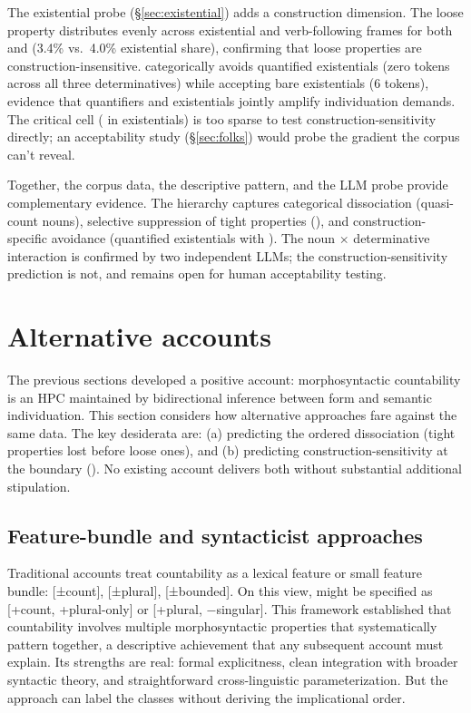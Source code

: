 \documentclass[12pt,a4paper]{article}
\begin{document}
The existential probe (\S\ref{sec:existential}) adds a construction dimension. The loose property  distributes evenly across existential and verb-following frames for both  and  (3.4\% vs.\ 4.0\% existential share), confirming that loose properties are construction-insensitive.  categorically avoids quantified existentials (zero tokens across all three determinatives) while accepting bare existentials (6 tokens), evidence that quantifiers and existentials jointly amplify individuation demands. The critical cell ( in existentials) is too sparse to test construction-sensitivity directly; an acceptability study (\S\ref{sec:folks}) would probe the gradient the corpus can't reveal.

Together, the corpus data, the descriptive pattern, and the LLM probe provide complementary evidence. The hierarchy captures categorical dissociation (quasi-count nouns), selective suppression of tight properties (), and construction-specific avoidance (quantified existentials with ). The noun $\times$ determinative interaction is confirmed by two independent LLMs; the construction-sensitivity prediction is not, and remains open for human acceptability testing.

\section{Alternative accounts}\label{sec:alternatives}

The previous sections developed a positive account: morphosyntactic countability is an HPC maintained by bidirectional inference between form and semantic individuation. This section considers how alternative approaches fare against the same data. The key desiderata are: (a) predicting the ordered dissociation (tight properties lost before loose ones), and (b) predicting construction-sensitivity at the boundary (). No existing account delivers both without substantial additional stipulation.

\subsection{Feature-bundle and syntacticist approaches}

Traditional accounts treat countability as a lexical feature or small feature bundle: [±count], [±plural], [±bounded]. On this view,  might be specified as [+count, +plural-only] or [+plural, −singular]. This framework established that countability involves multiple morphosyntactic properties that systematically pattern together, a descriptive achievement that any subsequent account must explain. Its strengths are real: formal explicitness, clean integration with broader syntactic theory, and straightforward cross-linguistic parameterization. But the approach can label the classes without deriving the implicational order.
\end{document}
